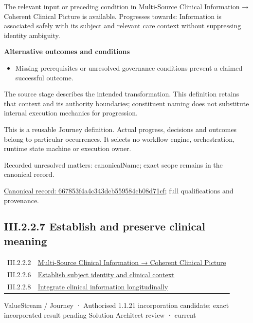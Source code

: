The relevant input or preceding condition in Multi-Source Clinical Information → Coherent Clinical Picture is available. Progresses towards: Information is associated safely with its subject and relevant care context without suppressing identity ambiguity.



\par\medskip\textbf{Alternative outcomes and conditions}\par


\begin{itemize}


\item Missing prerequisites or unresolved governance conditions prevent a claimed successful outcome.

\end{itemize}


The source stage describes the intended transformation. This definition retains that context and its authority boundaries; constituent naming does not substitute internal execution mechanics for progression.



This is a reusable Journey definition. Actual progress, decisions and outcomes belong to particular occurrences. It selects no workflow engine, orchestration, runtime state machine or execution owner.


{\small Recorded unresolved matters: canonicalName; exact scope remains in the canonical record.}\par
{\footnotesize \href{../../../../../../../continuum/strategy/value-stream/667853f4a4c343dcb559584cb08d71cf.md}{Canonical record: 667853f4a4c343dcb559584cb08d71cf}; full qualifications and provenance.}\par
\subsection*{III.2.2.7 Establish and preserve clinical meaning}
\label{navigation:III.2.2.7}

\begin{longtable}{p{.22\linewidth}p{.73\linewidth}}
III.2.2.2 & \hyperref[element:01f655eae3d8485699449c3dcf4f9b56]{Multi-Source Clinical Information → Coherent Clinical Picture} \\
III.2.2.6 & \hyperref[element:667853f4a4c343dcb559584cb08d71cf]{Establish subject identity and clinical context} \\
III.2.2.8 & \hyperref[element:80b2d41cb7fc4c929cee667353caa411]{Integrate clinical information longitudinally} \\
\end{longtable}
\label{element:e64c4ed500d84f0fa84a12646ea8b98d}
{\small ValueStream / Journey · Authorised 1.1.21 incorporation candidate; exact incorporated result pending Solution Architect review · current}\par

